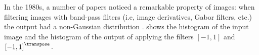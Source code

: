 In the 1980s, a number of papers noticed a remarkable property of images: when filtering images with band-pass filters (i.e, image derivatives, Gabor filters, etc.) the output had a non-Gaussian distribution \cite{Daugman1989,Field1987}.
\Fig{\ref{fig:derivativeshist}} shows the histogram of the input image and the histogram of the output of applying the filters $\left[-1,1\right]$ and $\left[-1,1\right]^\transpose$.

